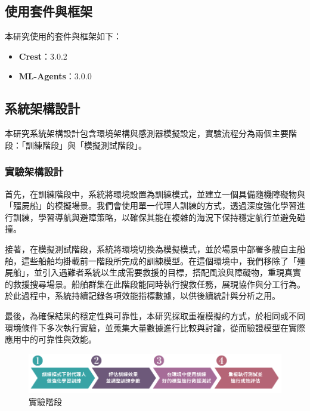 \documentclass[12pt,a4paper]{article}
\begin{document}
\subsection{使用套件與框架}
本研究使用的套件與框架如下：
\begin{itemize}
    \item \textbf{Crest}：3.0.2
    \item \textbf{ML-Agents}：3.0.0
\end{itemize}

\newpage

\subsection{系統架構設計}
本研究系統架構設計包含環境架構與感測器模擬設定，實驗流程分為兩個主要階段：「訓練階段」與「模擬測試階段」。

\subsubsection{實驗架構設計}
首先，在訓練階段中，系統將環境設置為訓練模式，並建立一個具備隨機障礙物與「殭屍船」的模擬場景。我們會使用單一代理人訓練的方式，透過深度強化學習進行訓練，學習導航與避障策略，以確保其能在複雜的海況下保持穩定航行並避免碰撞。
\\ \par
接著，在模擬測試階段，系統將環境切換為模擬模式，並於場景中部署多艘自主船舶，這些船舶均掛載前一階段所完成的訓練模型。在這個環境中，我們移除了「殭屍船」，並引入遇難者系統以生成需要救援的目標，搭配風浪與障礙物，重現真實的救援搜尋場景。船舶群集在此階段能同時執行搜救任務，展現協作與分工行為。於此過程中，系統持續記錄各項效能指標數據，以供後續統計與分析之用。
\\ \par
最後，為確保結果的穩定性與可靠性，本研究採取重複模擬的方式，於相同或不同環境條件下多次執行實驗，並蒐集大量數據進行比較與討論，從而驗證模型在實際應用中的可靠性與效能。

\vspace*{4cm}
\begin{figure}[h]
    \centering
    \begin{minipage}[t]{1\textwidth}
        \centering
        \includegraphics[width=\textwidth]{image/TrainingArch.png}
        \caption{實驗階段}
    \end{minipage}
\end{figure}
\end{document}
